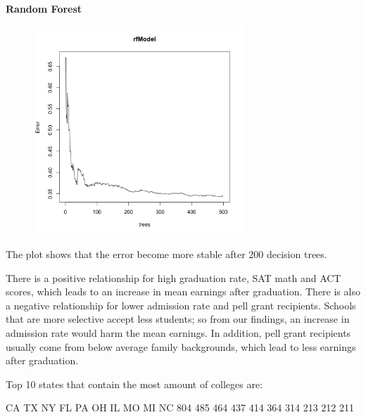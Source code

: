 \documentclass{article}
\begin{document}
\clearpage

\noindent \textbf{Random Forest}\newline

\begin{figure}[H]
\includegraphics[width=0.7\textwidth]{../images/rf_top.png}
\end{figure}
\noindent The plot shows that the error become more stable after 200 decision trees.


There is a positive relationship for high graduation rate, SAT math and ACT scores, which leads to an increase in mean earnings after graduation.  There is also a negative relationship for lower admission rate and pell grant recipients.  Schools that are more selective accept less students; so from our findings, an increase in admission rate would harm the mean earnings.  In addition, pell grant recipients usually come from below average family backgrounds, which lead to less earnings after graduation. 

\clearpage
\noindent Top 10 states that contain the most amount of colleges are:
\begin{Schunk}
\begin{Soutput}
 CA  TX  NY  FL  PA  OH  IL  MO  MI  NC 
804 485 464 437 414 364 314 213 212 211 
\end{Soutput}
\end{Schunk}
\end{document}

